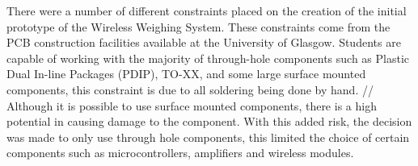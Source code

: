 There were a number of different constraints placed on the creation of the initial prototype of the Wireless Weighing System. These constraints come from the PCB construction facilities available at the University of Glasgow. Students are capable of working with the majority of through-hole components such as Plastic Dual In-line Packages (PDIP),
TO-XX, and some large surface mounted components, this constraint is due to all soldering being done by hand. //
Although it is possible to use surface mounted components, there is a high potential in causing damage to the component. With this added risk, the decision was made to only 
use through hole components, this limited the choice of certain components such as microcontrollers, amplifiers and wireless modules.
